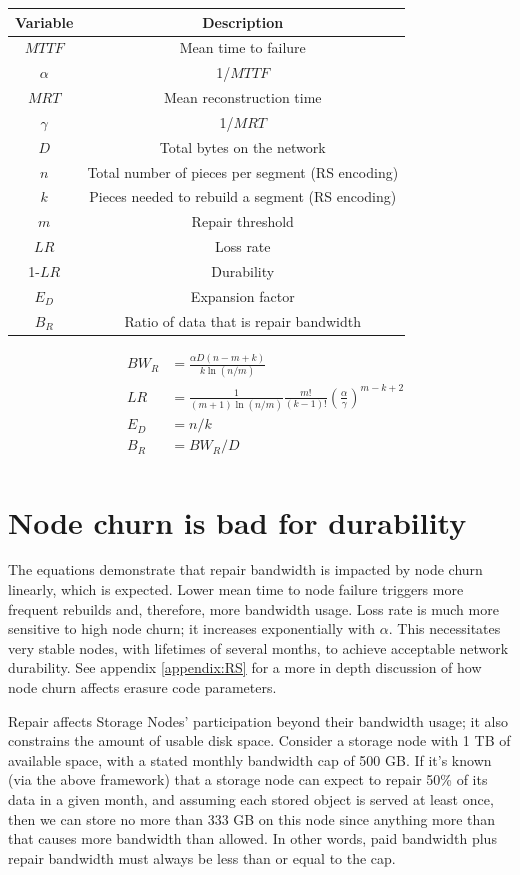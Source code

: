 \documentclass[8pt,fleqn,openany]{book}
\begin{document}
\begin{center}
\begin{tabular}{| c | c |}\hline
Variable & Description\\\hline
$MTTF$ & Mean time to failure \\
$\alpha$ & 1/$MTTF$\\
$MRT$ & Mean reconstruction time \\
$\gamma$ & 1/$MRT$\\
$D$&Total bytes on the network\\
$n$ & Total number of pieces per segment (RS encoding)\\
$k$ & Pieces needed to rebuild a segment (RS encoding)\\
$m$ & Repair threshold\\
$LR$ & Loss rate\\
1-$LR$ & Durability\\
$E_D$ & Expansion factor\\
$B_R$ & Ratio of data that is repair bandwidth\\
\hline
\end{tabular}
\end{center}

\begin{align*}
&&BW_R&=\frac{\alpha D(n-m+k)}{k\ln(n/m)}&\\
&&LR&=\frac{1}{(m+1)\ln(n/m)}\frac{m!}{(k-1)!}\left(\frac{\alpha}{\gamma}\right)^{m-k+2}&\\
&&E_D&=n/k&\\
&&B_R&=BW_R/D&\\
\end{align*}

\section{Node churn is bad for durability}\label{appendix:bandwidth-space-limits}

The equations demonstrate that repair bandwidth is impacted by node churn
linearly, which is expected.
Lower mean time to node failure triggers more frequent rebuilds and,
therefore, more bandwidth usage.
Loss rate is much more sensitive to high node churn; it increases
exponentially with $\alpha$.
This necessitates very stable nodes, with lifetimes of several months, to
achieve acceptable network durability.
See appendix \ref{appendix:RS} for a more in depth discussion of how node churn
affects erasure code parameters.

Repair affects Storage Nodes' participation beyond their bandwidth usage; it
also constrains the amount of usable disk space.
Consider a storage node with 1 TB of available space, with a stated monthly
bandwidth cap of 500 GB.
If it's known (via the above framework) that a storage node can expect to
repair 50\% of its data in a given month, and assuming each stored object
is served at least once, then we can store no more than 333 GB on this node
since anything more than that causes more bandwidth than allowed.
In other words, paid bandwidth plus repair bandwidth must always be less than
or equal to the cap.
\end{document}
